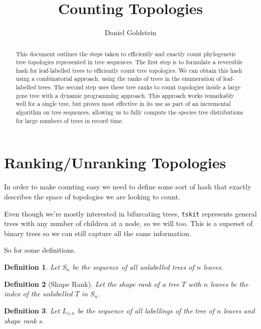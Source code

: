 \documentclass{article}
\newcommand{\tskit}{{\texttt{tskit}}}
\newtheorem{definition}{Definition}
\begin{document}
\title{Counting Topologies}
\author{Daniel Goldstein}
\maketitle

\begin{abstract}
    This document outlines the steps taken to efficiently and exactly
    count phylogenetic tree topologies represented in tree sequences.
    The first step is to formulate a reversible hash for leaf-labelled
    trees to efficiently count tree topologies.
    We can obtain this hash using a combinatorial approach, using
    the ranks of trees in the enumeration of leaf-labelled trees.
    The second step uses these tree ranks to count
    topologies inside a large gene tree with a dynamic programming
    approach. This approach works remarkably well for a single tree,
    but proves most effective in its use as part of an incremental
    algorithm on tree sequences, allowing us to fully compute the
    species tree distributions for large numbers of trees in record time.
\end{abstract}

\section{Ranking/Unranking Topologies}
In order to make counting easy we need to define some sort of hash that
exactly describes the space of topologies we are looking to count.

Even though we're mostly interested in bifurcating trees, \tskit{}
represents general trees with any number of children at a node, so we
will too. This is a superset of binary trees so we can still capture
all the same information.

So for some definitions.

\begin{definition}
    Let $S_n$ be the sequence of all unlabelled trees of $n$ leaves.
\end{definition}

\begin{definition}[Shape Rank]
    Let the shape rank of a tree $T$ with $n$ leaves be the index of the
    unlabelled $T$ in $S_n$.
\end{definition}

\begin{definition}
    Let $L_{s;n}$ be the sequence of all labellings of the tree of $n$ leaves
    and shape rank $s$.
\end{definition}
\end{document}
